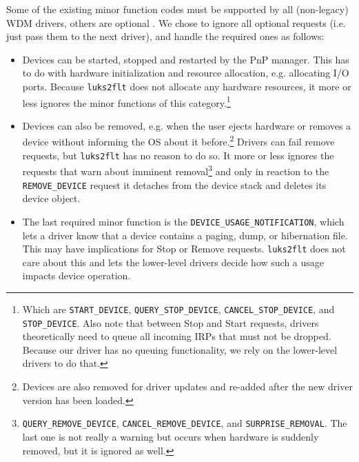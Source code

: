 Some of the existing minor function codes must be supported by all (non-legacy) WDM drivers, others are optional \cite{Kerneldriver}. We chose to ignore all optional requests (i.e. just pass them to the next driver), and handle the required ones as follows:
\begin{itemize}
	\item Devices can be started, stopped and restarted by the PnP manager. This has to do with hardware initialization and resource allocation, e.g. allocating I/O ports. Because \texttt{luks2flt} does not allocate any hardware resources, it more or less ignores the minor functions of this category.\footnote{\label{fn:ourapproach.final.pnpstartstop} Which are \texttt{START\_DEVICE}, \texttt{QUERY\_STOP\_DEVICE}, \texttt{CANCEL\_STOP\_DEVICE}, and \texttt{STOP\_DEVICE}. Also note that between Stop and Start requests, drivers theoretically need to queue all incoming IRPs that must not be dropped. Because our driver has no queuing functionality, we rely on the lower-level drivers to do that.}
	\item Devices can also be removed, e.g. when the user ejects hardware or removes a device without informing the OS about it before.\footnote{\label{fn:ourapproach.final.removeforupdate} Devices are also removed for driver updates and re-added after the new driver version has been loaded.} Drivers can fail remove requests, but \texttt{luks2flt} has no reason to do so. It more or less ignores the requests that warn about imminent removal\footnote{\label{fn:ourapproach.final.removalwarningpnp} \texttt{QUERY\_REMOVE\_DEVICE}, \texttt{CANCEL\_REMOVE\_DEVICE}, and \texttt{SURPRISE\_REMOVAL}. The last one is not really a warning but occurs when hardware is suddenly removed, but it is ignored as well.} and only in reaction to the \texttt{REMOVE\_DEVICE} request it detaches from the device stack and deletes its device object.
	\item The last required minor function is the \texttt{DEVICE\_USAGE\_NOTIFICATION}, which lets a driver know that a device contains a paging, dump, or hibernation file. This may have implications for Stop or Remove requests. \texttt{luks2flt} does not care about this and lets the lower-level drivers decide how such a usage impacts device operation.
\end{itemize}
%
